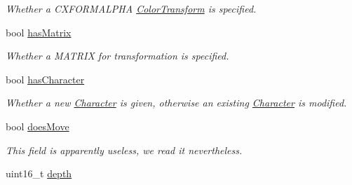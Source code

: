 \begin{DoxyCompactItemize}
\begin{DoxyCompactList}\small\item\em Whether a {\ttfamily C\+X\+F\+O\+R\+M\+A\+L\+P\+H\+A} \hyperlink{structjswf_1_1flash_1_1_color_transform}{Color\+Transform} is specified. \end{DoxyCompactList}\item 
\hypertarget{classjswf_1_1flash_1_1tags_1_1_place_object2_tag_af3da9671b4a1c7e39f4853baa26711ae}{bool \hyperlink{classjswf_1_1flash_1_1tags_1_1_place_object2_tag_af3da9671b4a1c7e39f4853baa26711ae}{has\+Matrix}}\label{classjswf_1_1flash_1_1tags_1_1_place_object2_tag_af3da9671b4a1c7e39f4853baa26711ae}

\begin{DoxyCompactList}\small\item\em Whether a {\ttfamily M\+A\+T\+R\+I\+X} for transformation is specified. \end{DoxyCompactList}\item 
\hypertarget{classjswf_1_1flash_1_1tags_1_1_place_object2_tag_aed71810502b17f7af161190bb5024385}{bool \hyperlink{classjswf_1_1flash_1_1tags_1_1_place_object2_tag_aed71810502b17f7af161190bb5024385}{has\+Character}}\label{classjswf_1_1flash_1_1tags_1_1_place_object2_tag_aed71810502b17f7af161190bb5024385}

\begin{DoxyCompactList}\small\item\em Whether a new {\ttfamily \hyperlink{classjswf_1_1flash_1_1_character}{Character}} is given, otherwise an existing {\ttfamily \hyperlink{classjswf_1_1flash_1_1_character}{Character}} is modified. \end{DoxyCompactList}\item 
\hypertarget{classjswf_1_1flash_1_1tags_1_1_place_object2_tag_a5ae692e8d3fa39609eceec1e3e935ee5}{bool \hyperlink{classjswf_1_1flash_1_1tags_1_1_place_object2_tag_a5ae692e8d3fa39609eceec1e3e935ee5}{does\+Move}}\label{classjswf_1_1flash_1_1tags_1_1_place_object2_tag_a5ae692e8d3fa39609eceec1e3e935ee5}

\begin{DoxyCompactList}\small\item\em This field is apparently useless, we read it nevertheless. \end{DoxyCompactList}\item 
\hypertarget{classjswf_1_1flash_1_1tags_1_1_place_object2_tag_a6eccee458c86a38414fee9d77da6dd39}{uint16\+\_\+t \hyperlink{classjswf_1_1flash_1_1tags_1_1_place_object2_tag_a6eccee458c86a38414fee9d77da6dd39}{depth}}\label{classjswf_1_1flash_1_1tags_1_1_place_object2_tag_a6eccee458c86a38414fee9d77da6dd39}


\end{DoxyCompactItemize}
